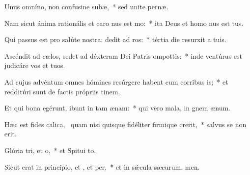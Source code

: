 \item Unus omníno, non confusine subæ,~* sed unite pernæ.
\item Nam sicut ánima rationális et caro nus est mo:~* ita Deus et homo nus est tus.
\item Qui passus est pro salúte nostra: dedit ad ros:~* tértia die resurxit a tuis.
\item Ascéndit ad cælos, sedet ad déxteram Dei Patris ompottis:~* inde ventúrus est judicáre vos et tuos.
\item Ad cujus advéntum omnes hómines resúrgere habent cum corribus is;~* et redditúri sunt de factis própriis tinem.
\item Et qui bona egérunt, ibunt in tam ænam:~* qui vero mala, in gnem ænum.
\item Hæc est fides calica,~\pscross{} quam nisi quisque fidéliter firmique crerit,~* salvus se non erit.
\item Glória tri, et o,~* et Spitui to.
\item Sicut erat in princípio, et , et per,~* et in sǽcula sæcurum. men.
